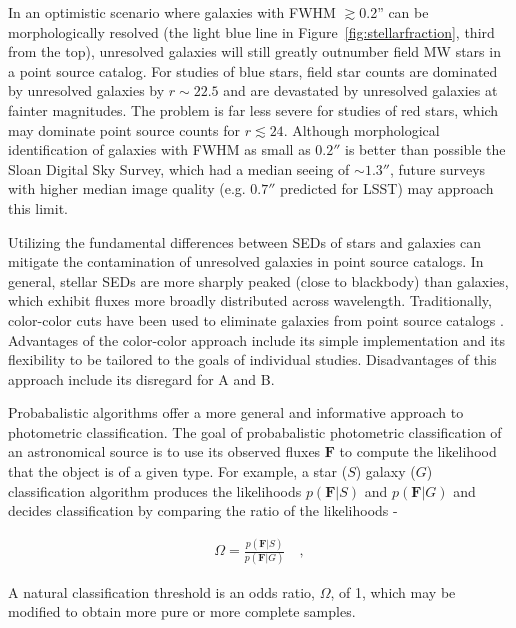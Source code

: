 \documentclass[12pt,preprint]{aastex}
\newcommand{\datavector}[1]{\boldsymbol{#1}}
\begin{document}
In an optimistic scenario where galaxies with FWHM $\gtrsim$0.2'' can
be morphologically resolved (the light blue line in
Figure~\ref{fig:stellarfraction}, third from the top), unresolved
galaxies will still greatly outnumber field MW stars in a point source
catalog.  For studies of blue stars, field star counts are dominated
by unresolved galaxies by $r\sim22.5$ and are devastated by unresolved
galaxies at fainter magnitudes. The problem is far less severe for
studies of red stars, which may dominate point source counts for
$r\lesssim24$. Although morphological identification of galaxies with
FWHM as small as $0.2''$ is better than possible the Sloan Digital Sky
Survey, which had a median seeing of $\sim1.3''$, future surveys with
higher median image quality (e.g. $0.7''$ predicted for LSST) may
approach this limit.

Utilizing the fundamental differences between SEDs of stars and
galaxies can mitigate the contamination of unresolved galaxies in
point source catalogs.  In general, stellar SEDs are more sharply
peaked (close to blackbody) than galaxies, which exhibit fluxes more
broadly distributed across wavelength.  Traditionally, color-color
cuts have been used to eliminate galaxies from point source catalogs
\citep[e.g.][]{gould92a,reitzel98a,daddi04a}.  Advantages of the
color-color approach include its simple implementation and its
flexibility to be tailored to the goals of individual studies.
Disadvantages of this approach include its disregard for A and B.

Probabalistic algorithms offer a more general and informative approach
to photometric classification.  The goal of probabalistic photometric
classification of an astronomical source is to use its observed fluxes
$\datavector{F}$ to compute the likelihood that the object is of a
given type.  For example, a star ($S$) galaxy ($G$) classification
algorithm produces the likelihoods $p(\datavector{F}|S)$ and
$p(\datavector{F}|G)$ and decides classification by comparing the
ratio of the likelihoods -

\begin{eqnarray}\displaystyle
\Omega = \frac{p(\datavector{F}|S)}{p(\datavector{F}|G)} 
\quad ,
\label{eqn:oddsratio}
\end{eqnarray}

\noindent A natural classification threshold is an odds ratio,
$\Omega$, of 1, which may be modified to obtain more pure or more
complete samples.
\end{document}
